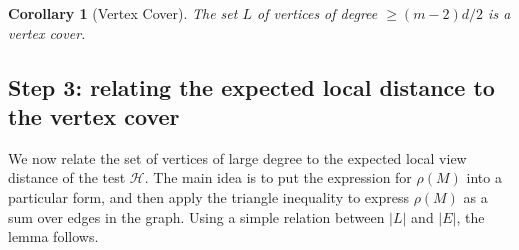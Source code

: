 \documentclass[11pt]{article}
\numberwithin{equation}{section}
\newtheorem{corollary}[theorem]{Corollary}
\theoremstyle{definition}
\theoremstyle{plain}
\theoremstyle{plain}
\newcommand{\colored}{}
\newcommand{\robust}{\colored{\rho}} %
\newcommand{\tester}{\colored{\mathcal H}} %
\newcommand{\codedist}{\colored{d}} %
\newcommand{\testerinput}{\colored{M}} %
\newcommand\abs[1]{\colored{\left|#1\right|}}
\begin{document}
\begin{corollary}[Vertex Cover]\label{cor:vc}
The set $L$ of vertices %
of   %
degree $\geq (m-2)\codedist/2$ is a vertex cover.
\end{corollary}

%
%
\subsection{Step 3: relating the expected local distance to the vertex cover}

We now relate the set of vertices of large degree to the expected local view distance of the test $\tester$. The main idea is to put the expression for $\robust(\testerinput)$ into a particular form, and then apply the triangle inequality to express $\robust(\testerinput)$ as a sum over edges in the graph. Using a simple relation between $\abs{L}$ and $\abs{E}$, the lemma follows.
\end{document}

